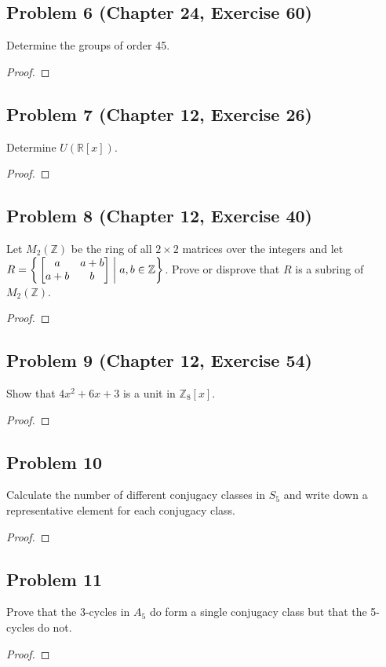\documentclass{article}
\begin{document}
\subsection*{Problem 6 (Chapter 24, Exercise 60)}
Determine the groups of order 45.
\begin{proof}

\end{proof}

\subsection*{Problem 7 (Chapter 12, Exercise 26)}
Determine $U(\mathbb{R}[x])$.
\begin{proof}

\end{proof}

\subsection*{Problem 8 (Chapter 12, Exercise 40)}
Let $M_2(\mathbb{Z})$ be the ring of all $2 \times 2$ matrices over the integers and let $R = \bigg \{ \begin{bmatrix} a & a + b \\ a + b & b \end{bmatrix} \biggm\vert a, b \in \mathbb{Z} \bigg \}$. Prove or disprove that $R$ is a subring of $M_2(\mathbb{Z})$.
\begin{proof}

\end{proof}

\subsection*{Problem 9 (Chapter 12, Exercise 54)}
Show that $4x^2 + 6x + 3$ is a unit in $\mathbb{Z}_8[x]$.
\begin{proof} 

\end{proof}

\subsection*{Problem 10}
Calculate the number of different conjugacy classes in $S_5$ and write down a representative element for each conjugacy class.
\begin{proof}

\end{proof}

\subsection*{Problem 11}
Prove that the 3-cycles in $A_5$ do form a single conjugacy class but that the 5-cycles do not.
\begin{proof}

\end{proof}
\end{document}
